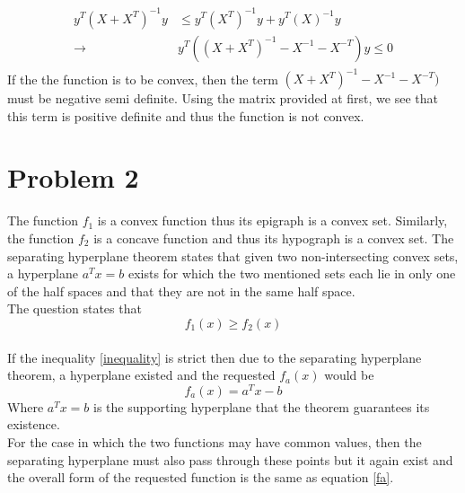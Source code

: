 \documentclass[a4paper]{article}
\begin{document}
\begin{Large}
	\begin{align}
	\begin{split}
		y^T(X+X^T)^{-1}y &\leq y^T(X^T)^{-1}y + y^T(X)^{-1}y\\
		\rightarrow &y^T((X+X^T)^{-1}-X^{-1}-X^{-T})y \leq 0
	\end{split}
	\end{align}
	If the the function is to be convex, then the term $ (X+X^T)^{-1}-X^{-1}-X^{-T}) $ must be negative semi definite. Using the matrix provided at first, we see that this term is positive definite and thus the function is not convex.
	\section*{Problem 2}
	The function $ f_1 $ is a convex function thus its epigraph is a convex set. Similarly, the function $ f_2 $ is a concave function and thus its hypograph is a convex set. The separating hyperplane theorem states that  given two non-intersecting  convex sets, a hyperplane $ a^Tx = b $ exists for which the two mentioned sets each lie in only one of the half spaces and that they are not in the same half space.\\ The question states that
	  \begin{equation}\label{inequality}
	f_1(x) \geq f_2(x)
	\end{equation}\\
	 If the inequality \ref{inequality} is strict then due to the separating hyperplane theorem, a hyperplane existed and the requested $ f_a(x) $ would be \begin{equation}\label{fa}
	f_a(x) = a^Tx-b
	\end{equation}
	Where $ a^Tx=b $ is the supporting hyperplane that the theorem guarantees its existence.\\
	For the case in which the two functions may have common values, then the separating hyperplane must also pass through these points but it again exist and the overall form of the requested function is the same as equation \ref{fa}.
	\newpage

\end{Large}
\end{document}
